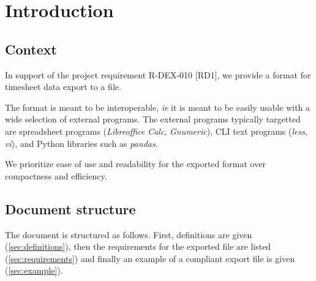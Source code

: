 \section{Introduction}
\subsection{Context}
In support of the project requirement R-DEX-010 [RD1], we provide a format
for timesheet data export to a file.

The format is meant to be interoperable, \textit{ie} it is meant to be
easily usable with a wide selection of external programs. The external
programs typically targetted are spreadsheet programs (\emph{Libreoffice Calc},
\emph{Gnumeric}), \gls{CLI} text programs (\emph{less}, \emph{vi}),
and Python libraries such as \emph{pandas}.

We prioritize ease of use and readability for the exported format over
compactness and efficiency.

\subsection{Document structure}
The document is structured as follows. First, definitions are given
(\cref{sec:definitions}), then the requirements for the exported file
are listed (\cref{sec:requirements}) and finally an example of a compliant
export file is given (\cref{sec:example}).
